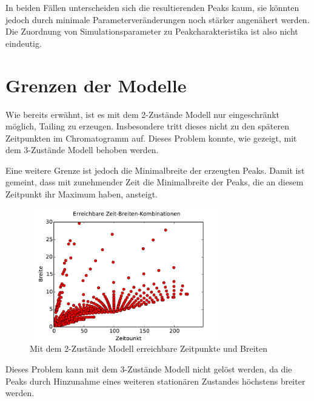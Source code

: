 In beiden Fällen unterscheiden sich die resultierenden Peaks kaum, sie könnten jedoch durch minimale Parameterveränderungen noch stärker angenähert werden. Die Zuordnung von Simulationsparameter zu Peakcharakteristika ist also nicht eindeutig.

\section{Grenzen der Modelle}

Wie bereits erwähnt, ist es mit dem 2-Zustände Modell nur eingeschränkt möglich, Tailing zu erzeugen. Insbesondere tritt dieses nicht zu den späteren Zeitpunkten im Chromatogramm auf. Dieses Problem konnte, wie gezeigt, mit dem 3-Zustände Modell behoben werden. 

Eine weitere Grenze ist jedoch die Minimalbreite der erzeugten Peaks. Damit ist gemeint, dass mit zunehmender Zeit die Minimalbreite der Peaks, die an diesem Zeitpunkt ihr Maximum haben, ansteigt. 


\begin{figure}[h]
\centering
\includegraphics[width=0.75\textwidth]{bilder/2s_zeitbreiten_ohnep}
\caption{Mit dem 2-Zustände Modell erreichbare Zeitpunkte und Breiten}
\label{Grenzen_2p_ohnep}
\end{figure}

Dieses Problem kann mit dem 3-Zustände Modell nicht gelöst werden, da die Peaks durch Hinzunahme eines weiteren stationären Zustandes höchstens breiter werden. 


